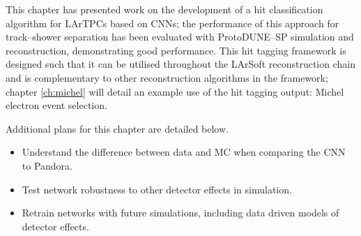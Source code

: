 This chapter has presented work on the development of a hit classification
algorithm for LArTPCs based on CNNs; the performance of this approach for
track--shower separation has been evaluated with ProtoDUNE--SP simulation and
reconstruction, demonstrating good performance. This hit tagging framework is
designed such that it can be utilised throughout the LArSoft reconstruction
chain and is complementary to other reconstruction algorithms in the framework;
chapter \ref{ch:michel} will detail an example use of the hit tagging output:
Michel electron event selection.

\noindent Additional plans for this chapter are detailed below.
\begin{itemize}[noitemsep,nolistsep]
	\item Understand the difference between data and MC when comparing the
	CNN to Pandora.
	\item Test network robustness to other detector effects in
	simulation. 
	\item Retrain networks with future simulations, including data
	driven models of detector effects.
\end{itemize}

